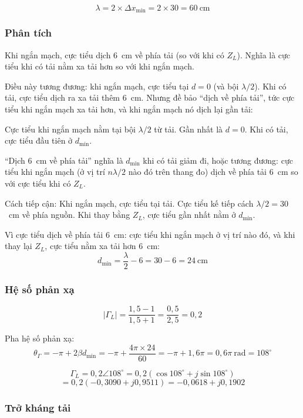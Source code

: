 \documentclass[12pt,a4paper]{article}
\begin{document}
\[
\lambda = 2 \times \Delta x_{\min} = 2 \times 30 = 60~\text{cm}
\]

\subsubsection{Phân tích}

Khi ngắn mạch, cực tiểu dịch $6$~cm về phía tải (so với khi có $Z_L$). Nghĩa là cực tiểu khi có tải nằm xa tải hơn so với khi ngắn mạch.

Điều này tương đương: khi ngắn mạch, cực tiểu tại $d = 0$ (và bội $\lambda/2$). Khi có tải, cực tiểu dịch ra xa tải thêm $6$~cm. Nhưng đề bảo ``dịch về phía tải'', tức cực tiểu khi ngắn mạch xa tải hơn, và khi ngắn mạch nó dịch lại gần tải:

Cực tiểu khi ngắn mạch nằm tại bội $\lambda/2$ từ tải. Gần nhất là $d = 0$. Khi có tải, cực tiểu đầu tiên ở $d_{\min}$.

``Dịch $6$~cm về phía tải'' nghĩa là $d_{\min}$ khi có tải giảm đi, hoặc tương đương: cực tiểu khi ngắn mạch (ở vị trí $n\lambda/2$ nào đó trên thang đo) dịch về phía tải $6$~cm so với cực tiểu khi có $Z_L$.

Cách tiếp cận: Khi ngắn mạch, cực tiểu tại tải. Cực tiểu kế tiếp cách $\lambda/2 = 30$~cm về phía nguồn. Khi thay bằng $Z_L$, cực tiểu gần nhất nằm ở $d_{\min}$.

Vì cực tiểu dịch về phía tải $6$~cm: cực tiểu khi ngắn mạch ở vị trí nào đó, và khi thay lại $Z_L$, cực tiểu nằm xa tải hơn $6$~cm:
\[
d_{\min} = \frac{\lambda}{2} - 6 = 30 - 6 = 24~\text{cm}
\]

\subsubsection{Hệ số phản xạ}

\[
|\Gamma_L| = \frac{1{,}5 - 1}{1{,}5 + 1} = \frac{0{,}5}{2{,}5} = 0{,}2
\]

Pha hệ số phản xạ:
\[
\theta_\Gamma = -\pi + 2\beta d_{\min} = -\pi + \frac{4\pi \times 24}{60} = -\pi + 1{,}6\pi = 0{,}6\pi~\text{rad} = 108^\circ
\]

\[
\Gamma_L = 0{,}2\angle 108^\circ = 0{,}2(\cos 108^\circ + j\sin 108^\circ)
\]
\[
= 0{,}2(-0{,}3090 + j0{,}9511) = -0{,}0618 + j0{,}1902
\]

\subsubsection{Trở kháng tải}
\end{document}
